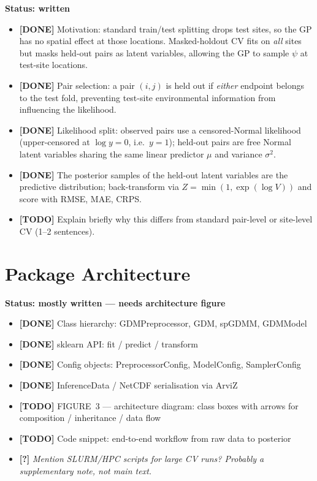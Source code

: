 \documentclass[11pt,a4paper]{article}
\newcommand{\done}[1]{{\color{donegreen}\textbf{[DONE]} #1}}
\newcommand{\todo}[1]{{\color{todored}\textbf{[TODO]} #1}}
\newcommand{\question}[1]{{\color{questionblue}\textbf{[?]} \textit{#1}}}
\newenvironment{scaffold}[1]{%
  \begin{mdframed}[backgroundcolor=gray!6, linecolor=gray!30,
                   leftmargin=0pt, rightmargin=0pt,
                   innerleftmargin=8pt, innerrightmargin=8pt,
                   innertopmargin=6pt, innerbottommargin=6pt]
  \noindent\textbf{#1}\par\vspace{2pt}
  \begin{itemize}[leftmargin=1.4em, topsep=2pt, itemsep=1pt, parsep=0pt]
}{%
  \end{itemize}
  \end{mdframed}
  \vspace{4pt}
}
\begin{document}
\begin{scaffold}{Status: written}
  \item \done{Motivation: standard train/test splitting drops test sites,
    so the GP has no spatial effect at those locations.  Masked-holdout CV
    fits on \emph{all} sites but masks held-out pairs as latent variables,
    allowing the GP to sample $\psi$ at test-site locations.}
  \item \done{Pair selection: a pair $(i,j)$ is held out if \emph{either}
    endpoint belongs to the test fold, preventing test-site environmental
    information from influencing the likelihood.}
  \item \done{Likelihood split: observed pairs use a censored-Normal
    likelihood (upper-censored at $\log y = 0$, i.e.\ $y = 1$);
    held-out pairs are free Normal latent variables sharing the same
    linear predictor $\mu$ and variance $\sigma^2$.}
  \item \done{The posterior samples of the held-out latent variables are
    the predictive distribution; back-transform via
    $Z = \min(1, \exp(\log V))$ and score with RMSE, MAE, CRPS.}
  \item \todo{Explain briefly why this differs from standard pair-level
    or site-level CV (1--2 sentences).}
\end{scaffold}


\section{Package Architecture}

\begin{scaffold}{Status: mostly written --- needs architecture figure}
  \item \done{Class hierarchy: GDMPreprocessor, GDM, spGDMM, GDMModel}
  \item \done{sklearn API: fit / predict / transform}
  \item \done{Config objects: PreprocessorConfig, ModelConfig, SamplerConfig}
  \item \done{InferenceData / NetCDF serialisation via ArviZ}
  \item \todo{FIGURE~3 --- architecture diagram: class boxes with arrows for
    composition / inheritance / data flow}
  \item \todo{Code snippet: end-to-end workflow from raw data to posterior}
  \item \question{Mention SLURM/HPC scripts for large CV runs? Probably a
    supplementary note, not main text.}
\end{scaffold}
\end{document}
